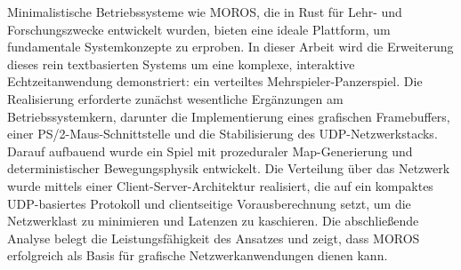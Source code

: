 Minimalistische Betriebssysteme wie MOROS, die in Rust für Lehr- und Forschungszwecke entwickelt wurden, bieten eine ideale Plattform, um fundamentale Systemkonzepte zu erproben. In dieser Arbeit wird die Erweiterung dieses rein textbasierten Systems um eine komplexe, interaktive Echtzeitanwendung demonstriert: ein verteiltes Mehrspieler-Panzerspiel. Die Realisierung erforderte zunächst wesentliche Ergänzungen am Betriebssystemkern, darunter die Implementierung eines grafischen Framebuffers, einer PS/2-Maus-Schnittstelle und die Stabilisierung des UDP-Netzwerkstacks. Darauf aufbauend wurde ein Spiel mit prozeduraler Map-Generierung und deterministischer Bewegungsphysik entwickelt. Die Verteilung über das Netzwerk wurde mittels einer Client-Server-Architektur realisiert, die auf ein kompaktes UDP-basiertes Protokoll und clientseitige Vorausberechnung setzt, um die Netzwerklast zu minimieren und Latenzen zu kaschieren. Die abschließende Analyse belegt die Leistungsfähigkeit des Ansatzes und zeigt, dass MOROS erfolgreich als Basis für grafische Netzwerkanwendungen dienen kann.
